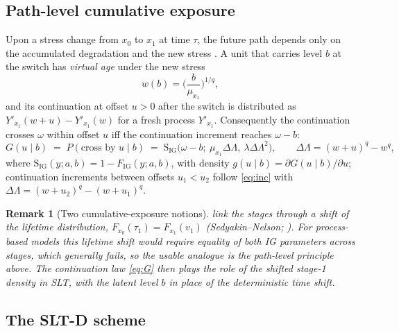 \documentclass[11pt]{article}
\newtheorem{remark}{Remark}
\newcommand{\SLTD}{SLT-D}
\begin{document}
\subsection{Path-level cumulative exposure}

Upon a stress change from $x_0$ to $x_1$ at time $\tau$, the future path depends only on the
accumulated degradation and the new stress \citep[cf.][]{WangWangDuan2016}. A unit that carries
level $b$ at the switch has \emph{virtual age} under the new stress
\begin{equation}\label{eq:w}
w(b)=\Big(\frac{b}{\mu_{x_1}}\Big)^{1/q},
\end{equation}
and its continuation at offset $u>0$ after the switch is distributed as
$Y'_{x_1}(w+u)-Y'_{x_1}(w)$ for a fresh process $Y'_{x_1}$. Consequently the continuation
crosses $\omega$ within offset $u$ iff the continuation increment reaches $\omega-b$:
\begin{equation}\label{eq:G}
G(u\mid b)\;=\;P(\text{cross by }u\mid b)
\;=\;\mathrm{S}_{\mathrm{IG}}\big(\omega-b;\ \mu_{x_1}\Delta\Lambda,\ \lambda\Delta\Lambda^{2}\big),
\qquad \Delta\Lambda=(w+u)^{q}-w^{q},
\end{equation}
where $\mathrm{S}_{\mathrm{IG}}(y;a,b)=1-F_{\mathrm{IG}}(y;a,b)$, with density $g(u\mid b)=
\partial G(u\mid b)/\partial u$; continuation increments between offsets $u_1<u_2$ follow
\eqref{eq:inc} with $\Delta\Lambda=(w+u_2)^q-(w+u_1)^q$.

\begin{remark}[Two cumulative-exposure notions]\label{rem:ce}
\citet{LaumenCramer2019} link the stages through a shift of the \emph{lifetime}
distribution, $F_{x_0}(\tau_1)=F_{x_1}(v_1)$ (Sedyakin--Nelson; \citealp{Nelson1980}). For
process-based models this lifetime shift would require equality of both IG parameters across
stages, which generally fails, so the usable analogue is the \emph{path-level} principle
above. The continuation law \eqref{eq:G} then plays the role of the shifted stage-1 density
in SLT, with the latent level $b$ in place of the deterministic time shift.
\end{remark}

\subsection{The \SLTD{} scheme}\label{sec:scheme}
\end{document}

